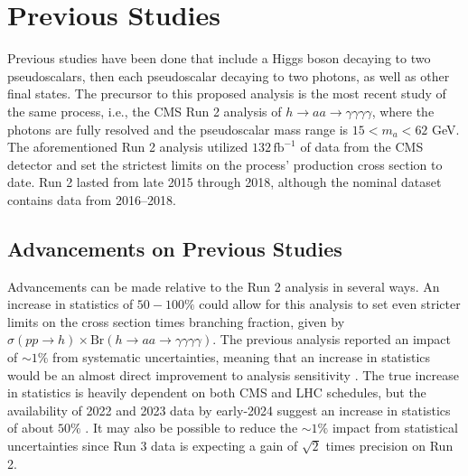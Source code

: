 \documentclass[12pt]{article}
\begin{document}
\section{Previous Studies}
Previous studies have been done that include a Higgs boson decaying to two pseudoscalars, then each pseudoscalar decaying to two photons, as well as other final states. The precursor to this proposed analysis is the most recent study of the same process, i.e., the CMS Run 2 analysis of $h\rightarrow aa \rightarrow \gamma\gamma\gamma\gamma$, where the photons are fully resolved and the pseudoscalar mass range is $15 < m_a < 62$ GeV. The aforementioned Run 2 analysis utilized $132\, \mathrm{fb}^{-1}$ of data from the CMS detector and set the strictest limits on the process' production cross section to date. Run 2 lasted from late 2015 through 2018, although the nominal dataset contains data from 2016--2018.\par

\subsection{Advancements on Previous Studies}
Advancements can be made relative to the Run 2 analysis in several ways. An increase in statistics of $50-100\%$ could allow for this analysis to set even stricter limits on the cross section times branching fraction, given by $\sigma(pp \rightarrow h) \times \mathrm{Br}(h\rightarrow aa \rightarrow \gamma\gamma\gamma\gamma)$. The previous analysis reported an impact of ${\sim}1\%$ from systematic uncertainties, meaning that an increase in statistics would be an almost direct improvement to analysis sensitivity \cite{Run2_analysis}. The true increase in statistics is heavily dependent on both CMS and LHC schedules, but the  availability of 2022 and 2023 data by early-2024 suggest an increase in statistics of about $50\%$ \cite{PC_CMS_Week}. It may also be possible to reduce the ${\sim}1\%$ impact from statistical uncertainties since Run 3 data is expecting a gain of $\sqrt{2}$ times precision on Run 2.\par
\end{document}
